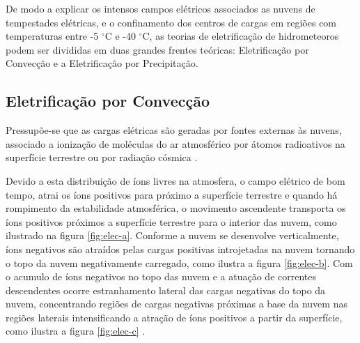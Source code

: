 
De modo a explicar os intensos campos elétricos associados as nuvens de tempestades elétricas, e o confinamento dos centros de cargas em regiões com temperaturas entre -5 $^{\circ}$C e -40 $^{\circ}$C, as teorias de eletrificação de hidrometeoros podem ser divididas em duas grandes frentes teóricas: Eletrificação por Convecção e a Eletrificação por Precipitação.



\subsection{Eletrificação por Convecção}

Pressupõe-se que as cargas elétricas são geradas por fontes externas às nuvens, associado a ionização de moléculas do ar atmosférico por átomos radioativos na superfície terrestre ou por radiação cósmica \cite{wilson1956,grenet1947, vonnegut1962,phillips1967}.

Devido a esta distribuição de íons livres na atmosfera, o campo elétrico de bom tempo, atrai os íons positivos para próximo a superfície terrestre e quando há rompimento da estabilidade atmosférica, o movimento ascendente transporta os íons positivos próximos a superfície terrestre para o interior das nuvem, como ilustrado na figura \ref{fig:elec-a}. Conforme a nuvem se desenvolve verticalmente, íons negativos são atraídos pelas cargas positivas introjetadas na nuvem tornando o topo da nuvem negativamente carregado, como ilustra a figura \ref{fig:elec-b}. Com o acumulo de íons negativos no topo das nuvem e a atuação de correntes descendentes ocorre estranhamento lateral das cargas negativas do topo da nuvem, concentrando regiões de cargas negativas próximas a base da nuvem nas regiões laterais intensificando a atração de íons positivos a partir da superfície, como ilustra a figura \ref{fig:elec-c} \cite{vonnegut1962,wagner1981,vonnegut1995}.

